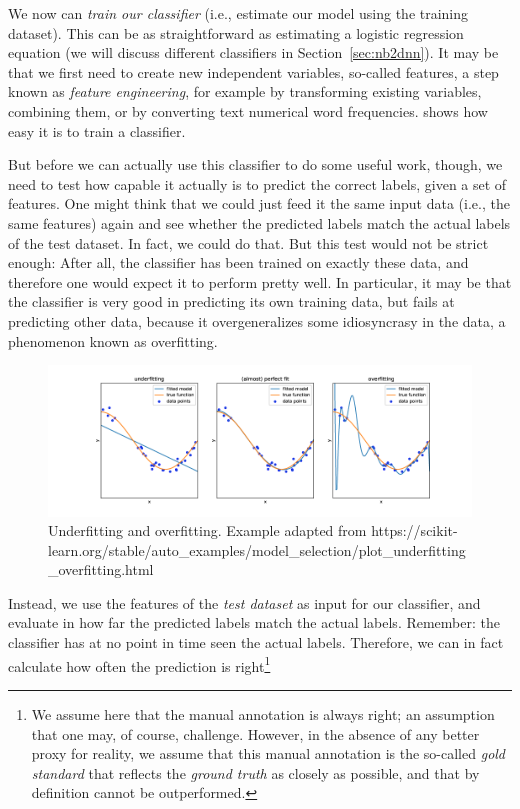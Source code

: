 We now can \emph{train our classifier} (i.e., estimate our model using the
training dataset). This can be as straightforward as estimating a
logistic regression equation (we will discuss different classifiers in
Section~\ref{sec:nb2dnn}).  It may be that we first need to create new
independent variables, so-called features, a step known as
\emph{feature engineering}, for example by transforming existing
variables, combining them, or by converting text numerical word
frequencies.
 shows how easy it is to train a classifier.


But before we can actually use this classifier to do some useful work,
though, we need to test how capable it actually is to predict the
correct labels, given a set of features. One might think that we could
just feed it the same input data (i.e., the same features) again and
see whether the predicted labels match the actual labels of the test
dataset.  In fact, we could do that.  But this test would not be
strict enough: After all, the classifier has been trained on exactly
these data, and therefore one would expect it to perform pretty well.
In particular, it may be that the classifier is very good in
predicting its own training data, but fails at predicting other data,
because it overgeneralizes some idiosyncrasy in the data, a phenomenon
known as overfitting.

\begin{figure} 
\centering
\includegraphics[width=\linewidth]{figures/ch09_overfitting}
\caption{Underfitting and overfitting. Example adapted from https://scikit-learn.org/stable/auto\_examples/model\_selection/plot\_underfitting\_overfitting.html}
\label{fig:roccurve}
\end{figure}

Instead, we use the features of the \emph{test dataset} as input for
our classifier, and evaluate in how far the predicted labels match the
actual labels.  Remember: the classifier has at no point in time seen
the actual labels.  Therefore, we can in fact calculate how often the
prediction is right\footnote{We assume here that the manual annotation
  is always right; an assumption that one may, of course,
  challenge. However, in the absence of any better proxy for reality,
  we assume that this manual annotation is the so-called \emph{gold
    standard} that reflects the \emph{ground truth} as closely as
  possible, and that by definition cannot be outperformed.}

